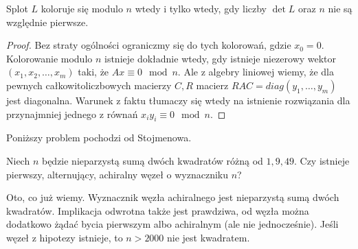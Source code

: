 
\begin{proposition}
    Splot $L$ koloruje się modulo $n$ wtedy i tylko wtedy, gdy liczby $\det L$ oraz $n$ nie są względnie pierwsze.
\end{proposition}

\begin{proof}
    Bez straty ogólności ograniczmy się do tych kolorowań, gdzie $x_0 = 0$.
    Kolorowanie modulo $n$ istnieje dokładnie wtedy, gdy istnieje niezerowy wektor $(x_1, x_2, \ldots, x_m)$ taki, że $Ax \equiv 0 \mod n$.
    Ale z algebry liniowej wiemy, że dla pewnych całkowitoliczbowych macierzy $C, R$ macierz $RAC = diag(y_1, \ldots, y_m)$ jest diagonalna.
    Warunek z faktu tłumaczy się wtedy na istnienie rozwiązania dla przynajmniej jednego z równań $x_iy_i \equiv 0 \mod n$.
\end{proof}

Poniższy problem pochodzi od Stojmenowa.

\begin{conjecture}
    Niech $n$ będzie nieparzystą sumą dwóch kwadratów różną od $1, 9, 49$.
    Czy istnieje pierwszy, alternujący, achiralny węzeł o wyznaczniku $n$?
\end{conjecture}

Oto, co już wiemy.
Wyznacznik węzła achiralnego jest nieparzystą sumą dwóch kwadratów.
Implikacja odwrotna także jest prawdziwa, od węzła można dodatkowo żądać bycia pierwszym albo achiralnym (ale nie jednocześnie).
Jeśli węzeł z hipotezy istnieje, to $n > 2000$ nie jest kwadratem.

